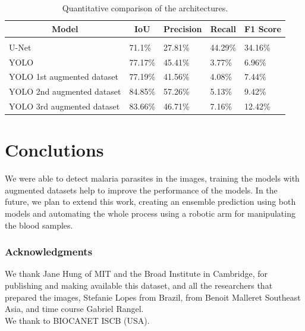 \documentclass{article} %
\begin{document}
\begin{table}[h]
\caption{Quantitative comparison of the architectures.}
\label{results-table}
\begin{center}
\begin{tabular}{lllll}
\multicolumn{1}{c}{\bf Model}  &\multicolumn{1}{c}{\bf IoU} 
&\multicolumn{1}{c}{\bf Precision} &\multicolumn{1}{c}{\bf Recall}
&\multicolumn{1}{c}{\bf F1 Score}
\\ \hline \\
U-Net &71.1\%	&27.81\%	&44.29\%	&34.16\%\\
YOLO &77.17\% &45.41\% &3.77\% &6.96\%\\ 
YOLO 1st augmented dataset  &77.19\%  &41.56\%	&4.08\%	&7.44\% \\
YOLO 2nd augmented dataset  &84.85\%  &57.26\%	&5.13\%	&9.42\% \\
YOLO 3rd augmented dataset  &83.66\%  &46.71\%	&7.16\%	&12.42\%
\end{tabular}
\end{center}
\end{table}

\section{Conclutions}
\label{headings}
We were able to detect malaria parasites in the images, training the models with augmented datasets help to improve the performance of the models. In the future, we plan to extend this work, creating an ensemble prediction using both models and automating the whole process using a robotic arm for manipulating the blood samples.

\subsubsection*{Acknowledgments}
We thank Jane Hung of MIT and the Broad Institute in Cambridge, for publishing and making available this dataset, and all the researchers that prepared the images, Stefanie Lopes from Brazil, from Benoit Malleret Southeast Asia, and time course Gabriel Rangel. \\
We thank to BIOCANET ISCB (USA).



\end{document}
